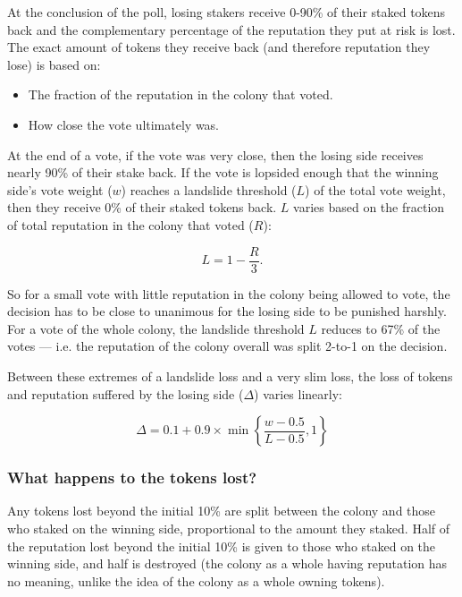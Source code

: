 At the conclusion of the poll, losing stakers receive 0-90\% of their staked tokens back and the complementary percentage of the reputation they put at risk is lost. The exact amount of tokens they receive back (and therefore reputation they lose) is based on:

\begin{itemize}
 \item The fraction of the reputation in the colony that voted.
 \item How close the vote ultimately was.
\end{itemize}

At the end of a vote, if the vote was very close, then the losing side receives nearly 90\% of their stake back. If the vote is lopsided enough that the winning side's vote weight ($w$) reaches a landslide threshold ($L$) of the total vote weight, then they receive 0\% of their staked tokens back. $L$ varies based on the fraction of total reputation in the colony that voted ($R$):

\begin{equation}
L = 1 - \frac{R}{3}.
\end{equation}

So for a small vote with little reputation in the colony being allowed to vote, the decision has to be close to unanimous for the losing side to be punished harshly. For a vote of the whole colony, the landslide threshold $L$ reduces to 67\% of the votes --- i.e. the reputation of the colony overall was split 2-to-1 on the decision.

Between these extremes of a landslide loss and a very slim loss, the loss of tokens and reputation suffered by the losing side ($\Delta$) varies linearly:

\begin{equation}
 \Delta = 0.1 + 0.9 \times \min \left\lbrace \frac{w-0.5}{L-0.5}, 1 \right\rbrace    
\end{equation}

\subsubsection*{What happens to the tokens lost?}
Any tokens lost beyond the initial 10\% are split between the colony and those who staked on the winning side, proportional to the amount they staked. Half of the reputation lost beyond the initial 10\% is given to those who staked on the winning side, and half is destroyed (the colony as a whole having reputation has no meaning, unlike the idea of the colony as a whole owning tokens).


